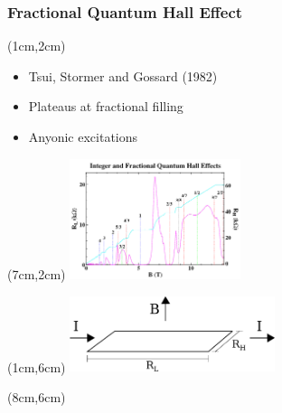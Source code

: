 \documentclass[xcolor=pdftex,dvipsnames]{beamer}
\begin{document}
\begin{frame}[t]
	  \frametitle{Fractional Quantum Hall Effect}
    \begin{textblock*}{6cm}(1cm,2cm) %
    \begin{itemize}
    \item Tsui, Stormer and Gossard (1982)
    \item Plateaus at fractional filling
    \item Anyonic excitations
    \end{itemize}
    \end{textblock*}

    \begin{textblock*}{5cm}(7cm,2cm) %
    \includegraphics[width=5cm]{FQHE_plateaus}
    \end{textblock*}

    \begin{textblock*}{6cm}(1cm,6cm) %
    \includegraphics[width=6cm]{FQHE_diagram}
    \end{textblock*}

    \begin{textblock*}{3cm}(8cm,6cm) %
    \end{textblock*}

\end{frame}
\end{document}
